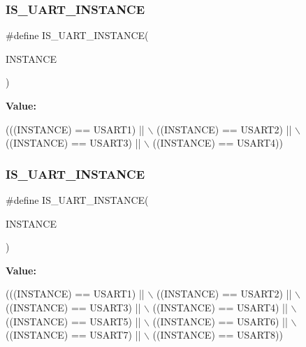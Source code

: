 \subsubsection{\texorpdfstring{I\+S\+\_\+\+U\+A\+R\+T\+\_\+\+I\+N\+S\+T\+A\+N\+CE}{IS\_UART\_INSTANCE}\hspace{0.1cm}{\footnotesize\ttfamily [11/13]}}
{\footnotesize\ttfamily \#define I\+S\+\_\+\+U\+A\+R\+T\+\_\+\+I\+N\+S\+T\+A\+N\+CE(\begin{DoxyParamCaption}\item[{}]{I\+N\+S\+T\+A\+N\+CE }\end{DoxyParamCaption})}

{\bfseries Value\+:}
\begin{DoxyCode}
(((INSTANCE) == USART1) || \(\backslash\)
                                      ((INSTANCE) == USART2) || \(\backslash\)
                                      ((INSTANCE) == USART3) || \(\backslash\)
                                      ((INSTANCE) == USART4))
\end{DoxyCode}
\mbox{\label{group___exported__macro_gacbd2efab4cd39d4867c4dbeacb87e84b}} 
\subsubsection{\texorpdfstring{I\+S\+\_\+\+U\+A\+R\+T\+\_\+\+I\+N\+S\+T\+A\+N\+CE}{IS\_UART\_INSTANCE}\hspace{0.1cm}{\footnotesize\ttfamily [12/13]}}
{\footnotesize\ttfamily \#define I\+S\+\_\+\+U\+A\+R\+T\+\_\+\+I\+N\+S\+T\+A\+N\+CE(\begin{DoxyParamCaption}\item[{}]{I\+N\+S\+T\+A\+N\+CE }\end{DoxyParamCaption})}

{\bfseries Value\+:}
\begin{DoxyCode}
(((INSTANCE) == USART1) || \(\backslash\)
                                      ((INSTANCE) == USART2) || \(\backslash\)
                                      ((INSTANCE) == USART3) || \(\backslash\)
                                      ((INSTANCE) == USART4) || \(\backslash\)
                                      ((INSTANCE) == USART5) || \(\backslash\)
                                      ((INSTANCE) == USART6) || \(\backslash\)
                                      ((INSTANCE) == USART7) || \(\backslash\)
                                      ((INSTANCE) == USART8))
\end{DoxyCode}
\mbox{\label{group___exported__macro_gacbd2efab4cd39d4867c4dbeacb87e84b}} 
